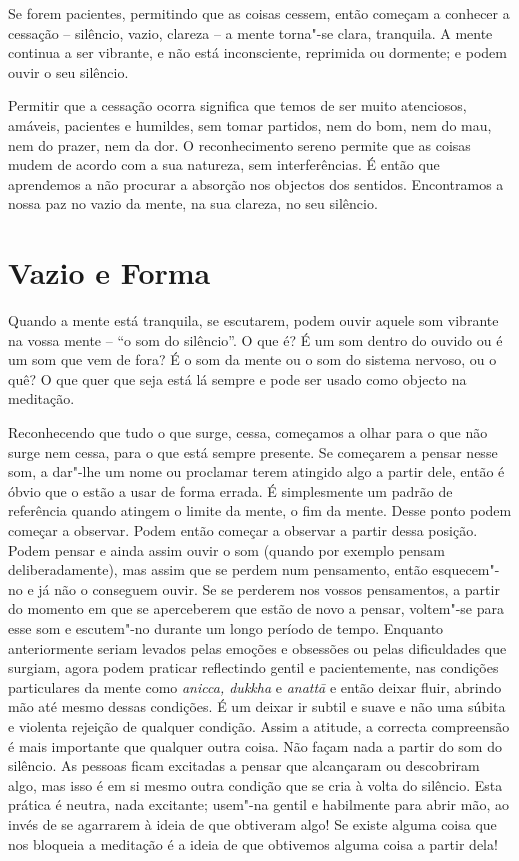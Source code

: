 Se forem pacientes, permitindo que as coisas cessem, então começam a
conhecer a cessação -- silêncio, vazio, clareza -- a mente torna"-se
clara, tranquila. A mente continua a ser vibrante, e não está
inconsciente, reprimida ou dormente; e podem ouvir o seu silêncio.

Permitir que a cessação ocorra significa que temos de ser muito
atenciosos, amáveis, pacientes e humildes, sem tomar partidos, nem do
bom, nem do mau, nem do prazer, nem da dor. O reconhecimento sereno
permite que as coisas mudem de acordo com a sua natureza, sem
interferências. É então que aprendemos a não procurar a absorção nos
objectos dos sentidos. Encontramos a nossa paz no vazio da mente, na sua
clareza, no seu silêncio.

\chapter{Vazio e Forma}

Quando a mente está tranquila, se escutarem, podem ouvir aquele som
vibrante na vossa mente -- ``o som do silêncio''. O que é? É um som
dentro do ouvido ou é um som que vem de fora? É o som da mente ou o som
do sistema nervoso, ou o quê? O que quer que seja está lá sempre e pode
ser usado como objecto na meditação.

Reconhecendo que tudo o que surge, cessa, começamos a olhar para o que
não surge nem cessa, para o que está sempre presente. Se começarem a
pensar nesse som, a dar"-lhe um nome ou proclamar terem atingido algo a
partir dele, então é óbvio que o estão a usar de forma errada. É
simplesmente um padrão de referência quando atingem o limite da mente, o
fim da mente. Desse ponto podem começar a observar. Podem então começar
a observar a partir dessa posição. Podem pensar e ainda assim ouvir o
som (quando por exemplo pensam deliberadamente), mas assim que se perdem
num pensamento, então esquecem"-no e já não o conseguem ouvir. Se se
perderem nos vossos pensamentos, a partir do momento em que se
aperceberem que estão de novo a pensar, voltem"-se para esse som e
escutem"-no durante um longo período de tempo. Enquanto anteriormente
seriam levados pelas emoções e obsessões ou pelas dificuldades que
surgiam, agora podem praticar reflectindo gentil e pacientemente, nas
condições particulares da mente como \emph{anicca, dukkha} e
\emph{anattā} e então deixar fluir, abrindo mão até mesmo dessas
condições. É um deixar ir subtil e suave e não uma súbita e violenta
rejeição de qualquer condição. Assim a atitude, a correcta compreensão é
mais importante que qualquer outra coisa. Não façam nada a partir do som
do silêncio. As pessoas ficam excitadas a pensar que alcançaram ou
descobriram algo, mas isso é em si mesmo outra condição que se cria à
volta do silêncio. Esta prática é neutra, nada excitante; usem"-na gentil
e habilmente para abrir mão, ao invés de se agarrarem à ideia de que
obtiveram algo! Se existe alguma coisa que nos bloqueia a meditação é a
ideia de que obtivemos alguma coisa a partir dela!

